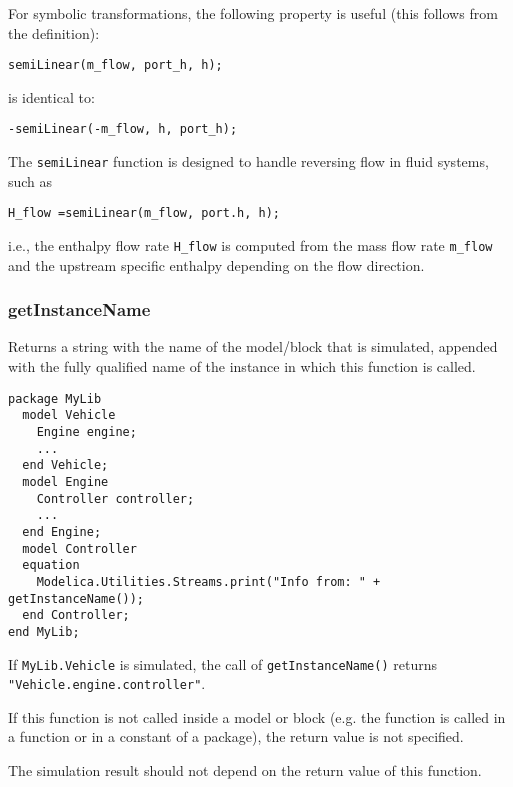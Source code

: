 \begin{nonnormative}
For symbolic transformations, the following property is useful
(this follows from the definition):
\begin{lstlisting}[language=modelica]
semiLinear(m_flow, port_h, h);
\end{lstlisting}
is identical to:
\begin{lstlisting}[language=modelica]
-semiLinear(-m_flow, h, port_h);
\end{lstlisting}

The \lstinline!semiLinear! function is designed to handle reversing
flow in fluid systems, such as
\begin{lstlisting}[language=modelica]
H_flow =semiLinear(m_flow, port.h, h);
\end{lstlisting}
i.e., the enthalpy flow rate \lstinline!H_flow! is computed from the
mass flow rate \lstinline!m_flow! and the upstream specific enthalpy
depending on the flow direction.
\end{nonnormative}

\subsubsection{getInstanceName}

Returns a string with the name of the model/block that is simulated,
appended with the fully qualified name of the instance in which this
function is called.

\begin{example}
\begin{lstlisting}[language=modelica]
package MyLib
  model Vehicle
    Engine engine;
    ...
  end Vehicle;
  model Engine
    Controller controller;
    ...
  end Engine;
  model Controller
  equation
    Modelica.Utilities.Streams.print("Info from: " + getInstanceName());
  end Controller;
end MyLib;
\end{lstlisting}
If \lstinline!MyLib.Vehicle! is simulated, the call of \lstinline!getInstanceName()!
returns \lstinline!"Vehicle.engine.controller"!.
\end{example}

If this function is not called inside a model or block (e.g. the
function is called in a function or in a constant of a package), the
return value is not specified.

\begin{nonnormative}
The simulation result should not depend on the return value of this function.
\end{nonnormative}

